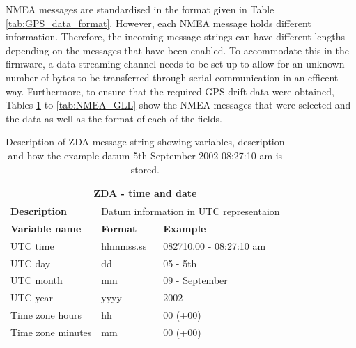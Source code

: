 NMEA messages are standardised in the format given in Table \ref{tab:GPS_data_format}. However, each NMEA message holds different information. Therefore, the incoming message strings can have different lengths depending on the messages that have been enabled. To accommodate this in the firmware, a data streaming channel needs to be set up to allow for an unknown number of bytes to be transferred through serial communication in an efficent way. Furthermore, to ensure that the required GPS drift data were obtained, Tables \ref{tab:NMEA_ZDA} to \ref{tab:NMEA_GLL} show the NMEA messages that were selected and the data as well as the format of each of the fields.

\begin{table}[H]
	\centering
	\caption{Description of ZDA message string showing variables, description and how the example datum 5th September 2002 08:27:10 am is stored.}
	\setlength{\extrarowheight}{5pt}
	\tiny
	\begin{tabular}{lll}
		\hline
		\hline
		\multicolumn{3}{c}{\textbf{ZDA - time and date}}\\
		\hline
		\hline
		\textbf{Description} & \multicolumn{2}{l}{Datum information in UTC representaion}\\
		\hline
		\textbf{Variable name} & \textbf{Format}& \textbf{Example} \\
		\hline
		\hline
		UTC time & hhmmss.ss & 082710.00 - 08:27:10 am\\
		
		UTC day & dd & 05 - 5th \\
		
		UTC month & mm & 09 - September\\
		
		UTC year & yyyy & 2002 \\
		
		Time zone hours & hh & 00 (+00)\\
		
		Time zone minutes & mm & 00 (+00)\\
		\hline
		\hline
	\end{tabular}
	\label{tab:NMEA_ZDA}
\end{table}

